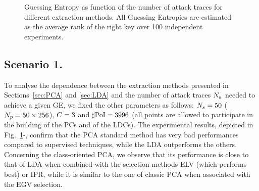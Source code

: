 \begin{figure}[t]
\caption[Guessing Entropy as function of the number of attack traces]{Guessing Entropy as function of the number of attack traces for different extraction methods. All Guessing Entropies are estimated as the average rank of the right key over 100 independent experiments.}\label{fig:scenario1}
\end{figure}
\subsection{Scenario 1.}
To analyse the dependence between the extraction methods presented in Sections~\ref{sec:PCA} and \ref{sec:LDA} and the number of attack traces $N_a$ needed to achieve a given GE, we fixed the other parameters as follows: $N_{s}=50$ ($N_p=50\times 256$), $C = 3$ and $\sharp\mathrm{PoI} = 3996$ (all points are allowed to participate in the building of the PCs and of the LDCs). The experimental results, depicted in Fig.~\ref{fig:scenario1}-, confirm that the PCA standard method has very bad performances compared to supervised techniques, while the LDA outperforms the others. Concerning the class-oriented PCA, we observe that its performance is close to that of LDA when combined with the selection methods ELV (which performs best) or IPR, while it is similar to the one of classic PCA when associated with the EGV selection.



